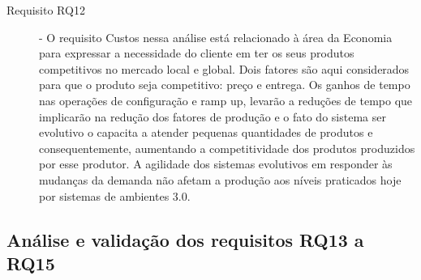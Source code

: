 \documentclass[10pt,letterpaper,twocolumn]{IEEEtran}
\begin{document}
\begin{description}
	\item[Requisito RQ12] - O requisito Custos nessa análise está relacionado à área da Economia para expressar a necessidade do cliente em ter os seus produtos competitivos no mercado local e global. Dois fatores são aqui considerados para que o produto seja competitivo: preço e entrega. Os ganhos de tempo nas operações de configuração e ramp up, levarão a reduções de tempo que implicarão na redução dos fatores de produção e o fato do sistema ser evolutivo o capacita a atender pequenas quantidades de produtos e consequentemente, aumentando a competitividade dos produtos produzidos por esse produtor. A agilidade dos sistemas evolutivos em responder às mudanças da demanda não afetam a produção aos níveis praticados hoje por sistemas de ambientes 3.0.
	
\end{description}	


\subsection{Análise e validação dos requisitos RQ13 a RQ15}	
\end{document}
